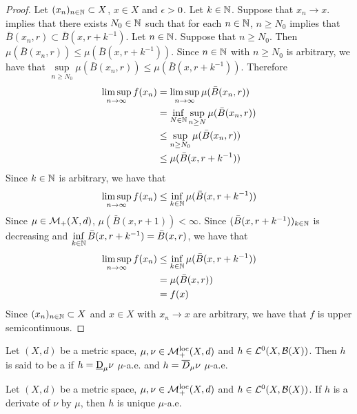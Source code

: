 \documentclass{book}
\begin{document}
	\begin{proof}
		Let $(x_n)_{n \in \mathbb{N}} \subset X$, $x \in X$ and $\epsilon > 0$. Let $k \in \mathbb{N}$. Suppose that $x_n \rightarrow x$.  implies that there exists $N_0 \in \mathbb{N}$ such that for each $n \in \mathbb{N}$, $n \geq N_0$ implies that $\bar{B}(x_n, r) \subset \bar{B}(x, r + k^{-1})$. Let $n \in \mathbb{N}$. Suppose that $n \geq N_0$. Then $\mu(\bar{B}(x_n, r)) \leq  \mu(\bar{B}(x, r + k^{-1}))$. Since $n \in \mathbb{N}$ with $n \geq N_0$ is arbitrary, we have that $\sup\limits_{n \geq N_0} \mu(\bar{B}(x_n, r)) \leq \mu(\bar{B}(x, r + k^{-1}))$. Therefore
		\begin{align*}
			\limsup_{n \rightarrow \infty} f(x_n)
			& = \limsup_{n \rightarrow \infty}  \mu(\bar{B}(x_n, r)) \\
			& = \inf_{N \in \mathbb{N}} \sup_{n \geq N} \mu(\bar{B}(x_n, r)) \\
			& \leq \sup_{n \geq N_0} \mu(\bar{B}(x_n, r)) \\
			& \leq \mu(\bar{B}(x, r + k^{-1}))
		\end{align*} 
		Since $k \in \mathbb{N}$ is arbitrary, we have that 
		$$\limsup\limits_{n \rightarrow \infty} f(x_n) \leq \inf\limits_{k \in \mathbb{N}} \mu(\bar{B}(x, r + k^{-1}))$$ 
		Since $\mu \in \mathcal{M}_+(X, d)$, $\mu(\bar{B}(x, r + 1)) < \infty$. Since $(\bar{B}(x, r + k^{-1}))_{k \in \mathbb{N}}$ is decreasing and $ \inf\limits_{k \in \mathbb{N}} \bar{B}(x, r + k^{-1}) = \bar{B}(x, r)$, we have that 
		\begin{align*}
			\limsup_{n \rightarrow \infty} f(x_n)
			& \leq \inf_{k \in \mathbb{N}} \mu(\bar{B}(x, r + k^{-1})) \\
			& = \mu(\bar{B}(x, r) )\\
			& = f(x)
		\end{align*}
		Since $(x_n)_{n \in \mathbb{N}} \subset X$ and $x \in X$ with $x_n \rightarrow x$ are arbitrary, we have that $f$ is upper semicontinuous. 
	\end{proof}

	\begin{defn} 
		Let $(X, d)$ be a metric space, $\mu, \nu \in \mathcal{M}_+^{\text{loc}}(X, d)$ and $h \in \mathcal{L}^0(X, \mathcal{B}(X))$. Then $h$ is said to be a  if $h = \underbar{D}_{\mu}\nu$ $\mu$-a.e. and $h = \overline{D}_{\mu}\nu$ $\mu$-a.e.
	\end{defn}

	\begin{ex} 
	Let $(X, d)$ be a metric space, $\mu, \nu \in \mathcal{M}_+^{\text{loc}}(X, d)$ and $h \in \mathcal{L}^0(X, \mathcal{B}(X))$. If $h$ is a derivate of $\nu$ by $\mu$, then $h$ is unique $\mu$-a.e.
	\end{ex}
	
\end{document}
